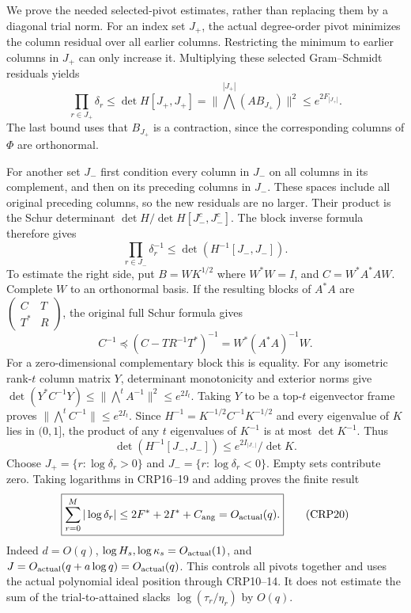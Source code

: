 We prove the needed selected-pivot estimates, rather than replacing
them by a diagonal trial norm. For an index set $J_+$, the actual
degree-order pivot minimizes the column residual over all earlier
columns. Restricting the minimum to earlier columns in $J_+$ can only
increase it. Multiplying these selected Gram--Schmidt residuals yields
\[
\prod_{r\in J_+}\delta_r\le\det H[J_+,J_+]
 =\|\bigwedge^{|J_+|}(AB_{J_+})\|^2
 \le e^{2F_{|J_+|}}.\tag{CRP16}
\]
The last bound uses that $B_{J_+}$ is a contraction, since the
corresponding columns of $\Phi$ are orthonormal.

For another set $J_-$ first condition every column in $J_-$ on all
columns in its complement, and then on its preceding columns in
$J_-$. These spaces include all original preceding columns, so the
new residuals are no larger. Their product is the Schur determinant
$\det H/\det H[J_-^c,J_-^c]$. The block inverse formula therefore gives
\[
\prod_{r\in J_-}\delta_r^{-1}
 \le\det(H^{-1}[J_-,J_-]).\tag{CRP17}
\]
To estimate the right side, put $B=WK^{1/2}$ where $W^*W=I$, and
$C=W^*A^*AW$. Complete $W$ to an orthonormal basis. If the resulting
blocks of $A^*A$ are $\left(\begin{smallmatrix}C&T\\T^*&R\end{smallmatrix}\right)$,
the original full Schur formula gives
\[
C^{-1}\preceq(C-TR^{-1}T^*)^{-1}=W^*(A^*A)^{-1}W.
\tag{CRP18}
\]
For a zero-dimensional complementary block this is equality. For
any isometric rank-$t$ column matrix $Y$, determinant monotonicity
and exterior norms give
$\det(Y^*C^{-1}Y)\le\|\bigwedge^t A^{-1}\|^2\le e^{2I_t}$.
Taking $Y$ to be a top-$t$ eigenvector frame proves
$\|\bigwedge^t C^{-1}\|\le e^{2I_t}$. Since
$H^{-1}=K^{-1/2}C^{-1}K^{-1/2}$ and every eigenvalue of $K$ lies in
$(0,1]$, the product of any $t$ eigenvalues of $K^{-1}$ is at most
$\det K^{-1}$. Thus
\[
\det(H^{-1}[J_-,J_-])\le e^{2I_{|J_-|}}/\det K.\tag{CRP19}
\]
Choose $J_+=\{r:\log\delta_r>0\}$ and
$J_-=\{r:\log\delta_r<0\}$. Empty sets contribute zero. Taking
logarithms in CRP16--19 and adding proves the finite result
\[
\boxed{\sum_{r=0}^M|\log\delta_r|
 \le 2F^*+2I^*+C_{\rm ang}=O_{\rm actual}(q).}\tag{CRP20}
\]
Indeed $d=O(q)$, $\log H_s,\log\kappa_s=O_{\rm actual}(1)$,
and $J=O_{\rm actual}(q+a\log q)=O_{\rm actual}(q)$.
This controls all pivots together and uses the actual polynomial
ideal position through CRP10--14. It does not estimate the sum of
the trial-to-attained slacks $\log(\tau_r/\eta_r)$ by $O(q)$.


